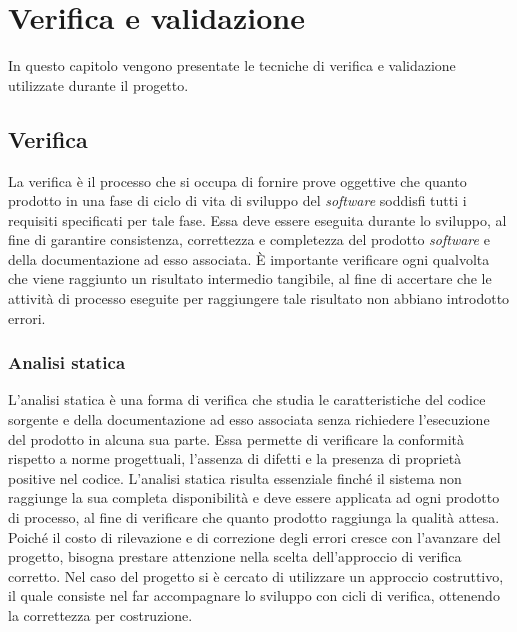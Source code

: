 
\chapter{Verifica e validazione}
\label{cap:verifica-validazione}

In questo capitolo vengono presentate le tecniche di verifica e validazione utilizzate durante il progetto.

\section{Verifica}

La verifica è il processo che si occupa di fornire prove oggettive che quanto prodotto in una fase di ciclo di vita di sviluppo del \textit{software} soddisfi tutti i requisiti specificati per tale fase. Essa deve essere eseguita durante lo sviluppo, al fine di garantire consistenza, correttezza e completezza del prodotto \textit{software} e della documentazione ad esso associata. È importante verificare ogni qualvolta che viene raggiunto un risultato intermedio tangibile, al fine di accertare che le attività di processo eseguite per raggiungere tale risultato non abbiano introdotto errori.

\subsection{Analisi statica}

L'analisi statica è una forma di verifica che studia le caratteristiche del codice sorgente e della documentazione ad esso associata senza richiedere l'esecuzione del prodotto in alcuna sua parte. Essa permette di verificare la conformità rispetto a norme progettuali, l'assenza di difetti e la presenza di proprietà positive nel codice. L'analisi statica risulta essenziale finché il sistema non raggiunge la sua completa disponibilità e deve essere applicata ad ogni prodotto di processo, al fine di verificare che quanto prodotto raggiunga la qualità attesa. Poiché il costo di rilevazione e di correzione degli errori cresce con l'avanzare del progetto, bisogna prestare attenzione nella scelta dell'approccio di verifica corretto. Nel caso del progetto si è cercato di utilizzare un approccio costruttivo, il quale consiste nel far accompagnare lo sviluppo con cicli di verifica, ottenendo la correttezza per costruzione.

